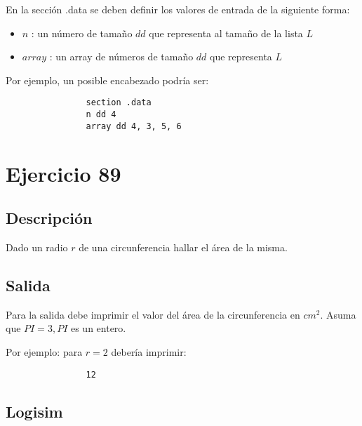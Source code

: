 \documentclass[a4paper]{article}
\begin{document}
\begin{flushleft}
      		 En la sección .data se deben definir los valores de entrada de la siguiente forma:
      		 
      		 \begin{itemize}
      		 	
      		 	\item $n$ : un número de tamaño $dd$ que representa al tamaño de la lista $L$
      		 	
      		 	\item $array$ : un array de números de tamaño $dd$ que representa $L$
      		 	
      		 	
      		 \end{itemize}
      		 
      		 Por ejemplo, un posible encabezado podría ser:
      		 
      		 \begin{lstlisting}
      		 	section .data
      		 	n dd 4
      		 	array dd 4, 3, 5, 6
      		 \end{lstlisting}
      		 
      		 
      		 \section{Ejercicio 89}
      			
      	    \subsection*{Descripción}
      	    
      	    Dado un radio $r$ de una circunferencia hallar el área de la misma.
      	     
      	     \subsection*{Salida}
      	     
      	     Para la salida debe imprimir el valor del área de la circunferencia en $cm^2$. Asuma que $PI = 3, PI$ es un entero.\newline
      	     
      	     Por ejemplo: para $r = 2$ debería imprimir:
      	     
      	     \begin{lstlisting}
      	     	12
      	     \end{lstlisting}
      	     
      	     	\subsection*{Logisim}
      	     

\end{flushleft}
\end{document}
